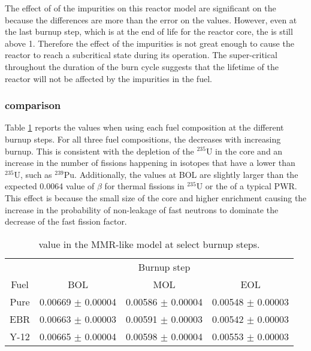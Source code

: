  

The effect of of the impurities on this reactor model are significant on the 
\keff because the differences are more than the error on the values. However, 
even at the last burnup step, which is at the end of life for the reactor 
core, the \keff is still above 1. Therefore the effect of the impurities 
is not great enough to cause the reactor to reach a subcritical state 
during its operation. The super-critical \keff throughout the duration 
of the burn cycle suggests that the lifetime of the reactor will not be 
affected by the impurities in the fuel.

\subsubsection{\betaEff comparison}

Table \ref{tab:mmr_betaeff} reports the \betaEff values when using 
each fuel composition at the different burnup steps. For all three 
fuel compositions, the \betaEff decreases with increasing burnup. This 
is consistent with the depletion of the $^{235}$U in the core and 
an increase in the number of fissions happening in isotopes
that have a lower \betaEff than $^{235}$U, such as $^{239}$Pu. 
Additionally, the \betaEff values at \gls{BOL} are slightly larger 
than the expected 0.0064 value of $\beta$ for thermal fissions in $^{235}$U
or the \betaEff of a typical \gls{PWR}. This effect is because the 
small size of the core and higher enrichment causing the 
increase in the probability of non-leakage of fast neutrons to 
dominate the decrease of the fast fission factor. 

\begin{table}[ht]
        \centering
        \caption{\betaEff value in the \gls{MMR}-like model at 
        select burnup steps.}
        \label{tab:mmr_betaeff}
        \begin{tabular}{c c c c}
                \hline 
                 & \multicolumn{3}{c}{Burnup step}\\
                Fuel & \gls{BOL} & \gls{MOL} & \gls{EOL}\\
                \hline 
                Pure & 0.00669 $\pm$ 0.00004 & 0.00586 $\pm$ 0.00004 & 0.00548 $\pm$ 0.00003\\
                \gls{EBR} & 0.00663 $\pm$ 0.00003 & 0.00591 $\pm$ 0.00003 & 0.00542 $\pm$ 0.00003\\
                Y-12 & 0.00665 $\pm$ 0.00004 &  0.00598 $\pm$ 0.00004& 0.00553 $\pm$ 0.00003\\
                \hline 

        \end{tabular}
\end{table}

